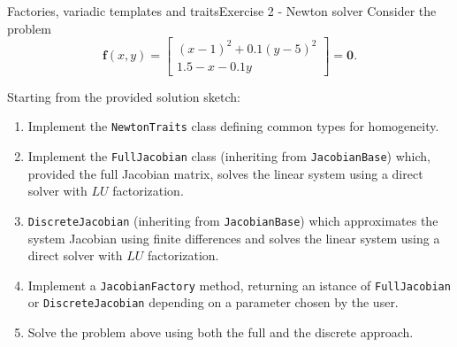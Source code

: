 \documentclass[10pt]{beamer}
\begin{document}
\begin{frame}{Factories, variadic templates and traits}{Exercise 2 - Newton solver}
	Consider the problem
	\[
	\mathbf{f}(x, y) =
	\begin{bmatrix}
		(x-1)^2 + 0.1(y - 5)^2 \\
		1.5 -x - 0.1y
	\end{bmatrix}
	=
	\mathbf{0}.
	\]
	
	Starting from the provided solution sketch:
	\begin{enumerate}
		\item Implement the \texttt{NewtonTraits} class defining common types for homogeneity.
		\item Implement the \texttt{FullJacobian} class (inheriting from \texttt{JacobianBase}) which, provided the full Jacobian matrix, solves the linear system using a direct solver with \(LU\) factorization.
		\item \texttt{DiscreteJacobian} (inheriting from \texttt{JacobianBase}) which approximates the system Jacobian using finite differences and solves the linear system using a direct solver with \(LU\) factorization.
		\item Implement a \texttt{JacobianFactory} method, returning an istance of \texttt{FullJacobian} or \texttt{DiscreteJacobian} depending on a parameter chosen by the user.
		\item Solve the problem above using both the full and the discrete approach.
	\end{enumerate}
\end{frame}
\end{document}
